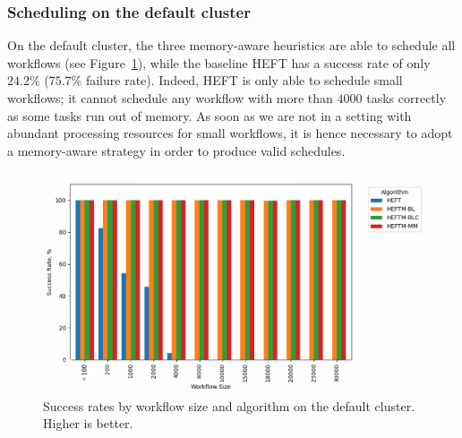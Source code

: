 \documentclass[conference]{IEEEtran}
\newcommand{\algo}[1]{\textsc{#1}}
\newcommand{\heft}{\algo{HEFT}\xspace}
\begin{document}
\subsubsection{Scheduling on the default cluster}
%
%
On the default cluster,  the three memory-aware heuristics are able to schedule all workflows
(see Figure~\ref{fig:success-rates-large}), while
the baseline \heft has a success rate of only $24.2\%$ ($75.7\%$ failure rate).
Indeed, \heft is only able to schedule small workflows; it cannot schedule any workflow 
with more than $4000$ tasks correctly as some tasks run out of memory. As soon as we are not in a setting
with abundant processing resources for small workflows, it is hence necessary to adopt
a memory-aware strategy in order to produce valid schedules.

\begin{figure}[tb]
  \centering
  \includegraphics[width=1.0\columnwidth] {images/success-rates-large2}
  \caption{Success rates by workflow size and algorithm on the default cluster. Higher is better.}
  \label{fig:success-rates-large}
\end{figure}
\end{document}
